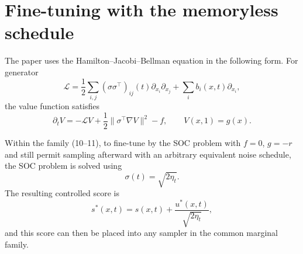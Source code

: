 \section{Fine-tuning with the memoryless schedule}

The paper uses the Hamilton--Jacobi--Bellman equation in the following form.  For generator
\begin{equation*}
 \mathcal L
 =\frac12\sum_{i,j}(\sigma\sigma^\top)_{ij}(t)\partial_{x_i}\partial_{x_j}
 +\sum_i b_i(x,t)\partial_{x_i},
 \tag{155}
\end{equation*}
the value function satisfies
\begin{equation*}
 \partial_tV=-\mathcal LV+\frac12\|\sigma^\top\nabla V\|^2-f,
 \qquad V(x,1)=g(x).
 \tag{156}
\end{equation*}

\begin{theorem}
Within the family (10--11), to fine-tune by the SOC problem with $f=0$, $g=-r$ and still permit sampling afterward with an arbitrary equivalent noise schedule, the SOC problem is solved using
\[
 \sigma(t)=\sqrt{2\eta_t}.
\]
The resulting controlled score is
\begin{equation*}
 s^*(x,t)=s(x,t)+\frac{u^*(x,t)}{\sqrt{2\eta_t}},
 \tag{170}
\end{equation*}
and this score can then be placed into any sampler in the common marginal family.
\end{theorem}

